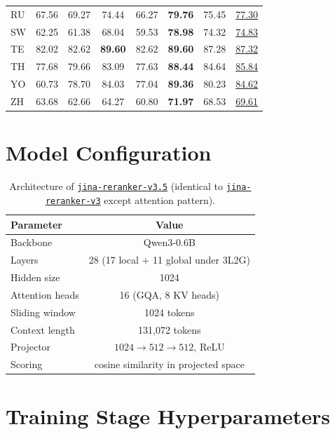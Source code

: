 \documentclass{article}
\newcommand{\jrrvthree}{\href{https://huggingface.co/jinaai/jina-reranker-v3}{\texttt{jina-reranker-v3}}}
\newcommand{\jrrvthreefive}{\href{https://huggingface.co/jinaai/jina-reranker-v3.5}{\texttt{jina-reranker-v3.5}}}
\begin{document}
\begin{table}[t]
{\begin{tabular}{lccccccc}
RU & 67.56 & 69.27 & 74.44 & 66.27 & \textbf{79.76} & 75.45 & \underline{77.30} \\
SW & 62.25 & 61.38 & 68.04 & 59.53 & \textbf{78.98} & 74.32 & \underline{74.83} \\
TE & 82.02 & 82.62 & \textbf{89.60} & 82.62 & \textbf{89.60} & 87.28 & \underline{87.32} \\
TH & 77.68 & 79.66 & 83.09 & 77.63 & \textbf{88.44} & 84.64 & \underline{85.84} \\
YO & 60.73 & 78.70 & 84.03 & 77.04 & \textbf{89.36} & 80.23 & \underline{84.62} \\
ZH & 63.68 & 62.66 & 64.27 & 60.80 & \textbf{71.97} & 68.53 & \underline{69.61} \\
\bottomrule
\end{tabular}%
}
\end{table}

\section{Model Configuration}
\label{app:config}

\begin{table}[h]
\centering
\caption{Architecture of \jrrvthreefive{} (identical to \jrrvthree{} except attention pattern).}
\begin{tabular}{lc}
\toprule
Parameter & Value \\
\midrule
Backbone & Qwen3-0.6B \\
Layers & 28 (17 local + 11 global under 3L2G) \\
Hidden size & 1024 \\
Attention heads & 16 (GQA, 8 KV heads) \\
Sliding window & 1024 tokens \\
Context length & 131{,}072 tokens \\
Projector & $1024 \rightarrow 512 \rightarrow 512$, ReLU \\
Scoring & cosine similarity in projected space \\
\bottomrule
\end{tabular}
\end{table}

\section{Training Stage Hyperparameters}
\label{app:hyper}
\end{document}
